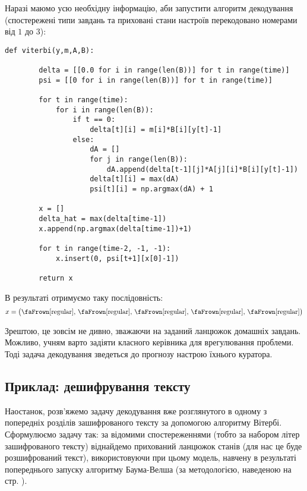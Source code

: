 Наразі маюмо усю необхідну інформацію, аби запустити алгоритм декодування (спостережені типи завдань та приховані стани настроїв перекодовано номерами від $1$ до $3$):

\vspace{0.4cm}
\begin{lstlisting}[firstnumber=1, label = code: viterbi, caption = Алгоритм Вітербі]
    def viterbi(y,m,A,B):

        delta = [[0.0 for i in range(len(B))] for t in range(time)]
        psi = [[0 for i in range(len(B))] for t in range(time)]

        for t in range(time):
            for i in range(len(B)):
                if t == 0: 
                    delta[t][i] = m[i]*B[i][y[t]-1]
                else:
                    dA = []
                    for j in range(len(B)):
                        dA.append(delta[t-1][j]*A[j][i]*B[i][y[t]-1])
                    delta[t][i] = max(dA)
                    psi[t][i] = np.argmax(dA) + 1

        x = []
        delta_hat = max(delta[time-1])
        x.append(np.argmax(delta[time-1])+1)

        for t in range(time-2, -1, -1):
            x.insert(0, psi[t+1][x[0]-1])

        return x
\end{lstlisting}

\vspace{0.4cm}
В результаті отримуємо таку послідовність:
\[ x=\bigl( \text{\faFrown[regular]},\,\text{\faFrown[regular]},\,\text{\faFrown[regular]},\,\text{\faFrown[regular]},\,\text{\faFrown[regular]} \bigr) \]

Зрештою, це зовсім не дивно, зважаючи на заданий ланцюжок домашніх завдань. Можливо, учням варто задіяти класного керівника для врегулювання проблеми. Тоді задача декодування зведеться до прогнозу настрою їхнього куратора.

\subsection{Приклад: дешифрування тексту}

Наостанок, розв'яжемо задачу декодування вже розглянутого в одному з попередніх розділів зашифрованого тексту за допомогою алгоритму Вітербі. Сформулюємо задачу так: за відомими спостереженнями (тобто за набором літер зашифрованого тексту) віднайдемо прихований ланцюжок станів (для нас це буде розшифрований текст), використовуючи при цьому модель, навчену в результаті попереднього запуску алгоритму Баума-Велша (за методологією, наведеною на стр. \pageref{section: text decoding by Baum-Welch}).

